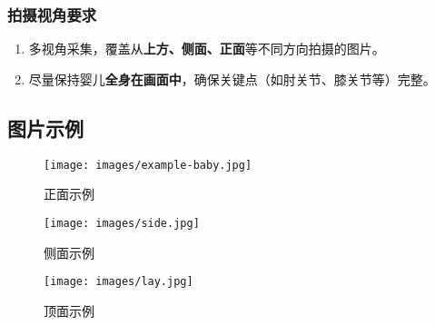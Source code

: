 \subsubsection{拍摄视角要求}

\begin{enumerate}
    \item 多视角采集，覆盖从\textbf{上方、侧面、正面}等不同方向拍摄的图片。
    \item 尽量保持婴儿\textbf{全身在画面中}，确保关键点（如肘关节、膝关节等）完整。
\end{enumerate}

\subsection{图片示例}

\begin{figure}[H]
    \centering
    \texttt{[image: images/example-baby.jpg]}
    \caption{正面示例}
    \label{fig:front}
\end{figure}

\begin{figure}[H]
    \centering
    \texttt{[image: images/side.jpg]}
    \caption{侧面示例}
    \label{fig:side}
\end{figure}

\begin{figure}[H]
    \centering
    \texttt{[image: images/lay.jpg]} 
    \caption{顶面示例}
    \label{fig:lay}
\end{figure}
